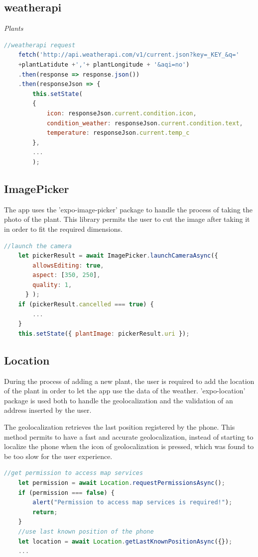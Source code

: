 \documentclass[10pt]{article}
\begin{document}
	\subsection{weatherapi}
	
	\textit{Plants} 
	
	\begin{lstlisting}[language=JavaScript]
    //weatherapi request
    fetch('http://api.weatherapi.com/v1/current.json?key=_KEY_&q='
    +plantLatidute +','+ plantLongitude + '&aqi=no')
    .then(response => response.json())
    .then(responseJson => {
        this.setState(
        {
            icon: responseJson.current.condition.icon,
            condition_weather: responseJson.current.condition.text,
            temperature: responseJson.current.temp_c
        },
        ...
        );
	\end{lstlisting}
	
	\subsection{ImagePicker}
	The app uses the 'expo-image-picker' package to handle the process of taking the photo of the plant. This library permits the user to cut the image after taking it in order to fit the required dimensions.
	
	\begin{lstlisting}[language=JavaScript]
    //launch the camera
    let pickerResult = await ImagePicker.launchCameraAsync({
        allowsEditing: true,
        aspect: [350, 250],
        quality: 1,
      } );
    if (pickerResult.cancelled === true) {
        ...
    }
    this.setState({ plantImage: pickerResult.uri });
	\end{lstlisting}
	
	\subsection{Location}
	During the process of adding a new plant, the user is required to add the location of the plant in order to let the app use the data of the weather. 'expo-location' package is used both to handle the geolocalization and the validation of an address inserted by the user.
	
	The geolocalization retrieves the last position registered by the phone. This method permits to have a fast and accurate geolocalization, instead of starting to localize the phone when the icon of geolocalization is pressed, which was found to be too slow for the user experience.
	\begin{lstlisting}[language=JavaScript]
    //get permission to access map services
    let permission = await Location.requestPermissionsAsync();
    if (permission === false) {
        alert("Permission to access map services is required!");
        return;
    }
    //use last known position of the phone
    let location = await Location.getLastKnownPositionAsync({});
    ...
	\end{lstlisting}
	
\end{document}
